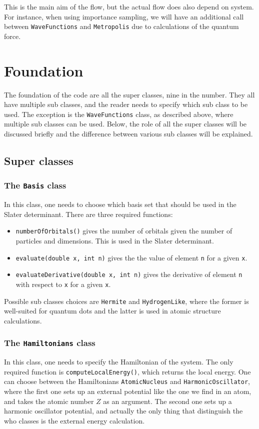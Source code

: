 

This is the main aim of the flow, but the actual flow does also depend on system. For instance, when using importance sampling, we will have an additional call between \texttt{WaveFunctions} and \texttt{Metropolis} due to calculations of the quantum force. 

\section{Foundation} \label{subsec:foundation}
The foundation of the code are all the super classes, nine in the number. They all have multiple sub classes, and the reader needs to specify which sub class to be used. The exception is the \texttt{WaveFunctions} class, as described above, where multiple sub classes can be used. Below, the role of all the super classes will be discussed briefly and the difference between various sub classes will be explained. 

\subsection{Super classes}

\subsubsection{The \texttt{Basis} class}
In this class, one needs to choose which basis set that should be used in the Slater determinant. There are three required functions:
\begin{itemize}
	\item \texttt{numberOfOrbitals()} gives the number of orbitals given the number of particles and dimensions. This is used in the Slater determinant.
	
	\item \texttt{evaluate(double x, int n)} gives the the value of element \texttt{n} for a given \texttt{x}. 
	
	\item \texttt{evaluateDerivative(double x, int n)} gives the derivative of element \texttt{n} with respect to \texttt{x} for a given \texttt{x}.  
\end{itemize}

Possible sub classes choices are \texttt{Hermite} and \texttt{HydrogenLike}, where the former is well-suited for quantum dots and the latter is used in atomic structure calculations. 

\subsubsection{The \texttt{Hamiltonians} class}
In this class, one needs to specify the Hamiltonian of the system. The only required function is \texttt{computeLocalEnergy()}, which returns the local energy. One can choose between the Hamiltonians \texttt{AtomicNucleus} and \texttt{HarmonicOscillator}, where the first one sets up an external potential like the one we find in an atom, and takes the atomic number $Z$ as an argument. The second one sets up a harmonic oscillator potential, and actually the only thing that distinguish the who classes is the external energy calculation. 


